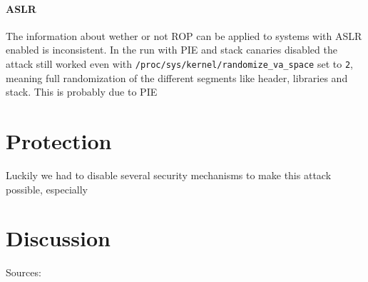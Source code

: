 \documentclass[journal=tosc,submission, notanonymous]{iacrtrans}
\begin{document}
\paragraph{ASLR}
The information about wether or not ROP can be applied to systems with ASLR enabled is inconsistent. In the run with PIE and stack canaries disabled the attack still worked even with \Verb+/proc/sys/kernel/randomize_va_space+ set to \Verb+2+, meaning full randomization of the different segments like header, libraries and stack. This is probably due to PIE

\section{Protection}
Luckily we had to disable several security mechanisms to make this attack possible, especially 

\section{Discussion}
Sources:



\end{document}
